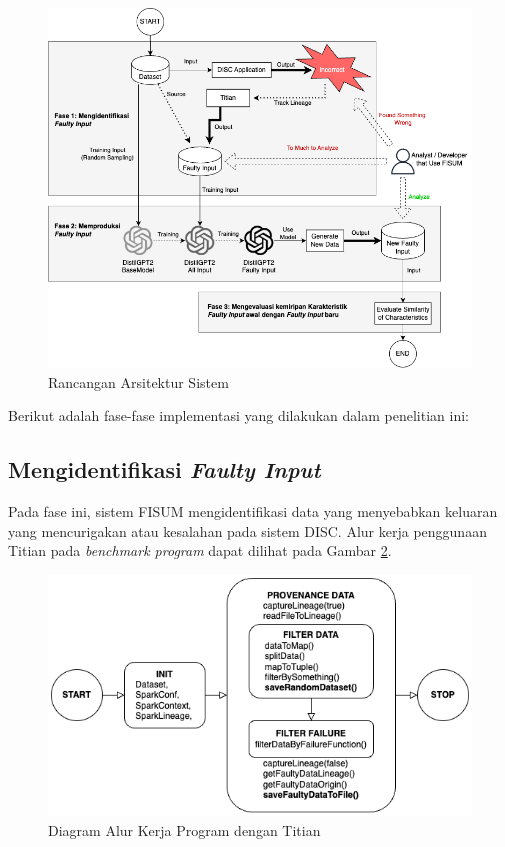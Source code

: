 \begin{figure}[H]
  \centering
  \includegraphics[scale=0.5]{gambar/ArsitekturFISUM.png}

  \caption{Rancangan Arsitektur Sistem}
  \label{fig:arsitektur2}
\end{figure}

Berikut adalah fase-fase implementasi yang dilakukan dalam
penelitian ini:

\subsection{Mengidentifikasi \emph{Faulty Input}}
\label{sec:mengidentifikasifaultyinput}

Pada fase ini, sistem FISUM mengidentifikasi data 
yang menyebabkan keluaran yang mencurigakan atau 
kesalahan pada sistem DISC. Alur kerja penggunaan Titian pada \emph{benchmark program}
dapat dilihat pada Gambar \ref{fig:diagramofprogramwithtitian}.

\begin{figure}[H]
  \centering
  \includegraphics[scale=0.5]{gambar/DiagramOfProgramWithTitian.png}

  \caption{Diagram Alur Kerja Program dengan Titian}
  \label{fig:diagramofprogramwithtitian}
\end{figure}


